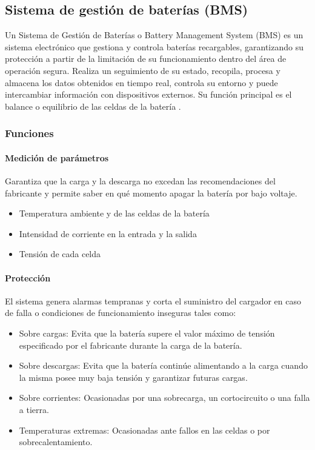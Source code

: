 \subsection{Sistema de gestión de baterías (BMS)}

Un Sistema de Gestión de Baterías o Battery Management System (BMS) es un sistema electrónico que gestiona y controla baterías recargables,
garantizando su protección a partir de la limitación de su funcionamiento dentro del área de operación segura.
Realiza un seguimiento de su estado, recopila, procesa y almacena los datos obtenidos en tiempo real, controla su entorno y puede intercambiar información con dispositivos externos.
Su función principal es el balance o equilibrio de las celdas de la batería \cite{bms}.

\subsubsection{Funciones}

\paragraph{Medición de parámetros}
Garantiza que la carga y la descarga no excedan las recomendaciones del fabricante y permite saber en qué momento apagar la batería por bajo voltaje. 

\begin{itemize}
    \item Temperatura ambiente y de las celdas de la batería
    \item Intensidad de corriente en la entrada y la salida
    \item Tensión de cada celda
\end{itemize}

\paragraph{Protección}
El sistema genera alarmas tempranas y corta el suministro del cargador en caso de falla o condiciones de funcionamiento inseguras tales como:

\begin{itemize}
    \item Sobre cargas: Evita que la batería supere el valor máximo de tensión especificado por el fabricante durante la carga de la batería.
    \item Sobre descargas: Evita que la batería continúe alimentando a la carga cuando la misma posee muy baja tensión y garantizar futuras cargas. 
    \item Sobre corrientes: Ocasionadas por una sobrecarga, un cortocircuito o una falla a tierra.
    \item Temperaturas extremas: Ocasionadas ante fallos en las celdas o por sobrecalentamiento.
\end{itemize}

